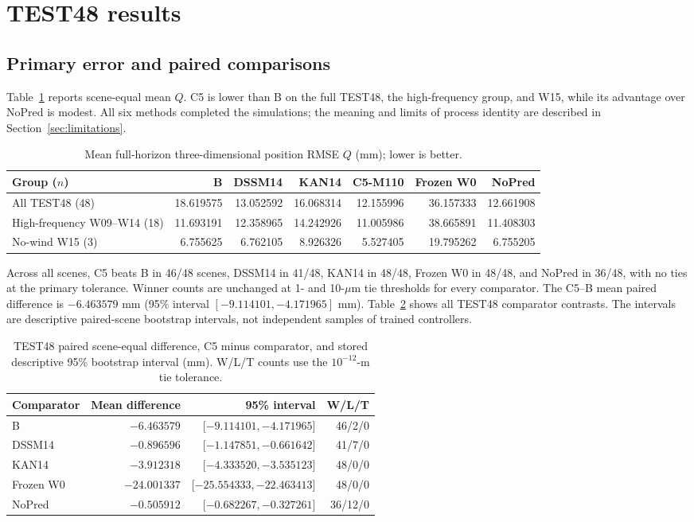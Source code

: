 \documentclass[11pt]{article}
\begin{document}
\section{TEST48 results}
\subsection{Primary error and paired comparisons}
Table~\ref{tab:groupmeans} reports scene-equal mean $Q$. C5 is lower than B on the full TEST48, the high-frequency group, and W15, while its advantage over NoPred is modest. All six methods completed the simulations; the meaning and limits of process identity are described in Section~\ref{sec:limitations}.

\begin{table}[t]
\centering
\small
\caption{Mean full-horizon three-dimensional position RMSE $Q$ (mm); lower is better.}
\label{tab:groupmeans}
\begin{tabular}{lrrrrrr}
\toprule
Group ($n$) & B & DSSM14 & KAN14 & C5-M110 & Frozen W0 & NoPred \\
\midrule
All TEST48 (48) & 18.619575 & 13.052592 & 16.068314 & 12.155996 & 36.157333 & 12.661908 \\
High-frequency W09--W14 (18) & 11.693191 & 12.358965 & 14.242926 & 11.005986 & 38.665891 & 11.408303 \\
No-wind W15 (3) & 6.755625 & 6.762105 & 8.926326 & 5.527405 & 19.795262 & 6.755205 \\
\bottomrule
\end{tabular}
\end{table}

Across all scenes, C5 beats B in 46/48 scenes, DSSM14 in 41/48, KAN14 in 48/48, Frozen W0 in 48/48, and NoPred in 36/48, with no ties at the primary tolerance. Winner counts are unchanged at 1- and 10-$\mu$m tie thresholds for every comparator. The C5--B mean paired difference is $-6.463579$ mm (95\% interval $[-9.114101,-4.171965]$ mm). Table~\ref{tab:contrasts} shows all TEST48 comparator contrasts. The intervals are descriptive paired-scene bootstrap intervals, not independent samples of trained controllers.

\begin{table}[t]
\centering
\small
\caption{TEST48 paired scene-equal difference, C5 minus comparator, and stored descriptive 95\% bootstrap interval (mm). W/L/T counts use the $10^{-12}$-m tie tolerance.}
\label{tab:contrasts}
\begin{tabular}{lrrr}
\toprule
Comparator & Mean difference & 95\% interval & W/L/T \\
\midrule
B & $-6.463579$ & [$-9.114101,-4.171965$] & 46/2/0 \\
DSSM14 & $-0.896596$ & [$-1.147851,-0.661642$] & 41/7/0 \\
KAN14 & $-3.912318$ & [$-4.333520,-3.535123$] & 48/0/0 \\
Frozen W0 & $-24.001337$ & [$-25.554333,-22.463413$] & 48/0/0 \\
NoPred & $-0.505912$ & [$-0.682267,-0.327261$] & 36/12/0 \\
\bottomrule
\end{tabular}
\end{table}
\end{document}
